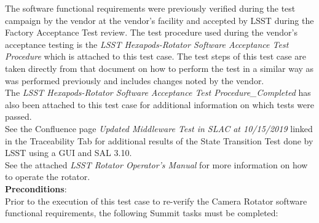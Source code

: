 \documentclass[SE,lsstdraft,STR,toc]{lsstdoc}
\begin{document}
The software functional requirements were previously verified during the
test campaign by the vendor at the vendor's facility and accepted by
LSST during the Factory Acceptance Test review. The test procedure used
during the vendor's acceptance testing is the \emph{LSST
Hexapods-Rotator Software Acceptance Test Procedure} which is attached
to this test case. The test steps of this test case are taken directly
from that document on how to perform the test in a similar way as was
performed previously and includes changes noted by the
vendor.\\[2\baselineskip]The \emph{LSST Hexapods-Rotator Software
Acceptance Test Procedure\_Completed} has also been attached to this
test case for additional information on which tests were
passed.\\[2\baselineskip]See the Confluence page \emph{Updated
Middleware Test in SLAC at 10/15/2019} linked in the Traceability Tab
for additional results of the State Transition Test done by LSST using a
GUI and SAL 3.10.\\[2\baselineskip]See the attached \emph{LSST Rotator
Operator's Manual} for more information on how to operate the
rotator.\\[2\baselineskip]


\textbf{ Preconditions}:\\
Prior to the execution of this test case to re-verify the Camera Rotator
software functional requirements, the following Summit tasks must be
completed:\\
\end{document}
